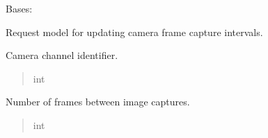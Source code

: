 \documentclass[letterpaper,10pt,english]{sphinxmanual}
\begin{document}
\begin{fulllineitems}
\label{\detokenize{modules/src.pig_sorting_api.main:src.pig_sorting_api.main.FrameIntervalRequest}}
\pysigstartsignatures
\pysiglinewithargsret
{}
{\sphinxparamcomma {}}
{}
\pysigstopsignatures
\sphinxAtStartPar
Bases: 

\sphinxAtStartPar
Request model for updating camera frame capture intervals.

\begin{fulllineitems}
\label{\detokenize{modules/src.pig_sorting_api.main:src.pig_sorting_api.main.FrameIntervalRequest.channel}}
\pysigstartsignatures
\pysigline
{}
\pysigstopsignatures
\sphinxAtStartPar
Camera channel identifier.
\begin{quote}\begin{description}
\sphinxAtStartPar
int

\end{description}\end{quote}

\end{fulllineitems}


\begin{fulllineitems}
\label{\detokenize{modules/src.pig_sorting_api.main:src.pig_sorting_api.main.FrameIntervalRequest.interval}}
\pysigstartsignatures
\pysigline
{}
\pysigstopsignatures
\sphinxAtStartPar
Number of frames between image captures.
\begin{quote}\begin{description}
\sphinxAtStartPar
int


\end{description}
\end{quote}
\end{fulllineitems}
\end{fulllineitems}
\end{document}
